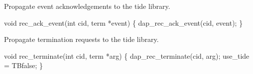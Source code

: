 

Propagate event acknowledgements to the tide library.

\nwenddocs{}\endmoddef\let\nwnotused=\nwoutput{}
void rec_ack_event(int cid, term *event)
\{
  dap_rec_ack_event(cid, event);
\}
\nwendcode{}\nwdocspar


Propagate termination requests to the tide library.

\nwenddocs{}\endmoddef\let\nwnotused=\nwoutput{}
void rec_terminate(int cid, term *arg)
\{
  dap_rec_terminate(cid, arg);
  use_tide = TBfalse;
\}
\nwendcode{}

